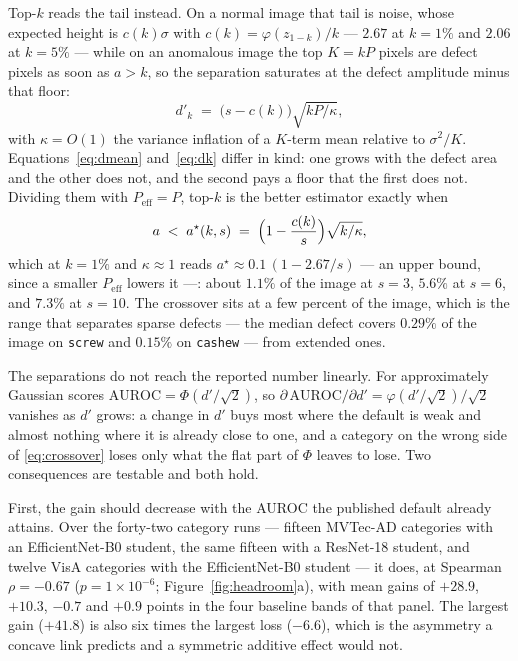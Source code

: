 Top-$k$ reads the tail instead. On a normal image that tail is noise, whose
expected height is $c(k)\sigma$ with
$c(k)=\varphi\!\left(z_{1-k}\right)/k$ --- $2.67$ at $k=1\%$ and $2.06$ at
$k=5\%$ --- while on an anomalous image the top $K=kP$ pixels are defect pixels as
soon as $a>k$, so the separation saturates at the defect amplitude minus that
floor:
\begin{equation}
d'_{k} \;=\; \bigl(s-c(k)\bigr)\sqrt{kP/\kappa},
\label{eq:dk}
\end{equation}
with $\kappa=O(1)$ the variance inflation of a $K$-term mean relative to
$\sigma^{2}/K$. Equations~\eqref{eq:dmean} and~\eqref{eq:dk} differ in kind: one
grows with the defect area and the other does not, and the second pays a floor
that the first does not. Dividing them with $P_{\text{eff}}=P$, top-$k$ is the
better estimator exactly when
\begin{equation}
a \;<\; a^{\star}(k,s) \;=\; \Bigl(1-\frac{c(k)}{s}\Bigr)\sqrt{k/\kappa},
\label{eq:crossover}
\end{equation}
which at $k=1\%$ and $\kappa\approx1$ reads $a^{\star}\approx0.1\,(1-2.67/s)$ --- an
upper bound, since a smaller $P_{\text{eff}}$ lowers it ---: about $1.1\%$ of the
image at $s=3$, $5.6\%$ at
$s=6$, and $7.3\%$ at $s=10$. The crossover sits at a few percent of the image,
which is the range that separates sparse defects --- the median defect covers
$0.29\%$ of the image on \texttt{screw} and $0.15\%$ on \texttt{cashew} --- from
extended ones.

The separations do not reach the reported number linearly. For approximately
Gaussian scores $\mathrm{AUROC}=\Phi(d'/\sqrt2)$, so
$\partial\,\mathrm{AUROC}/\partial d'=\varphi(d'/\sqrt2)/\sqrt2$ vanishes as $d'$
grows: a change in $d'$ buys most where the default is weak and almost nothing
where it is already close to one, and a category on the wrong side of
\eqref{eq:crossover} loses only what the flat part of $\Phi$ leaves to lose. Two
consequences are testable and both hold.

First, the gain should decrease with the AUROC the published default already
attains. Over the forty-two category runs --- fifteen MVTec-AD categories with an
EfficientNet-B0 student, the same fifteen with a ResNet-18 student, and twelve
VisA categories with the EfficientNet-B0 student --- it does, at Spearman
$\rho=-0.67$ ($p=1\times10^{-6}$; Figure~\ref{fig:headroom}a), with mean gains of
$+28.9$, $+10.3$, $-0.7$ and $+0.9$ points in the four baseline bands of that
panel. The largest gain ($+41.8$) is also six times the largest loss
($-6.6$), which is the asymmetry a concave link predicts and a symmetric additive
effect would not.

